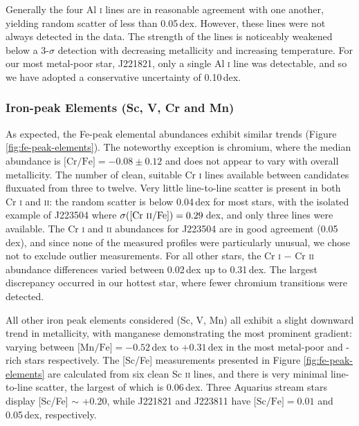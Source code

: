 \documentclass{emulateapj}
\begin{document}
Generally the four Al \textsc{i} lines are in reasonable agreement with one another, yielding random scatter of less than 0.05\,dex. However, these lines were not always detected in the data. The strength of the lines is noticeably weakened below a 3-$\sigma$ detection with decreasing metallicity and increasing temperature. For our most metal-poor star, J221821, only a single Al \textsc{i} line was detectable, and so we have adopted a conservative uncertainty of 0.10\,dex. 


\subsubsection{Iron-peak Elements (Sc, V, Cr and Mn)}

As expected, the Fe-peak elemental abundances exhibit similar trends (Figure \ref{fig:fe-peak-elements}). The noteworthy exception is chromium, where the median abundance is $\mbox{[Cr/Fe]} = -0.08 \pm 0.12$ and does not appear to vary with overall metallicity. The number of clean, suitable Cr \textsc{i} lines available between candidates fluxuated from three to twelve. Very little line-to-line scatter is present in both Cr \textsc{i} and \textsc{ii}: the random scatter is below 0.04\,dex for most stars, with the isolated example of J223504 where $\sigma(\mbox{[Cr \textsc{ii}/Fe]}) = 0.29$\,dex, and only three lines were available. The Cr \textsc{i} and \textsc{ii} abundances for J223504 are in good agreement (0.05\,dex), and since none of the measured profiles were particularly unusual, we chose not to exclude outlier measurements. For all other stars, the Cr \textsc{i} $-$ Cr \textsc{ii} abundance differences varied between 0.02\,dex up to 0.31\,dex. The largest discrepancy occurred in our hottest star, where fewer chromium transitions were detected.

All other iron peak elements considered (Sc, V, Mn) all exhibit a slight downward trend in metallicity, with manganese demonstrating the most prominent gradient: varying between $\mbox{[Mn/Fe]} = -0.52$\,dex to $+0.31$\,dex in the most metal-poor and -rich stars respectively. The [Sc/Fe] measurements presented in Figure \ref{fig:fe-peak-elements} are calculated from six clean Sc \textsc{ii} lines, and there is very minimal line-to-line scatter, the largest of which is 0.06\,dex. Three Aquarius stream stars display [Sc/Fe] $\sim$ +0.20, while J221821 and J223811 have $\mbox{[Sc/Fe]} = 0.01$ and 0.05\,dex, respectively.
\end{document}

